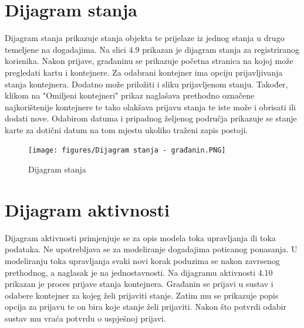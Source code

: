 			\eject
		
		\section{Dijagram stanja}
		
		Dijagram stanja prikazuje stanja objekta te prijelaze iz jednog stanja u drugo temeljene na dogadajima. Na slici 4.9 prikazan je dijagram stanja za registriranog
korisnika. Nakon prijave, građaninu se prikazuje početna stranica na kojoj može pregledati kartu i kontejnere. Za odabrani kontejner ima opciju prijavljivanja stanja kontejnera. Dodatno može priložiti i sliku prijavljenom stanju. Također, klikom na "Omiljeni kontejneri" prikaz naglašava prethodno označene najkorištenije kontejnere te tako olakšava prijavu stanja te iste može i obrisati ili dodati nove. Odabirom datuma i pripadnog željenog područja prikazuje se stanje karte za dotični datum na tom mjestu ukoliko traženi zapis postoji.
			
			\begin{figure}[H]
				\texttt{[image: figures/Dijagram stanja - građanin.PNG]}
				\centering
				\caption{Dijagram stanja}
				\label{fig:Dijagram stanja}
			\end{figure}
			
			\eject 
		
		\section{Dijagram aktivnosti}
			
			Dijagram aktivnosti primjenjuje se za opis modela toka upravljanja ili toka podataka. Ne upotrebljava se za modeliranje dogadajima poticanog ponasanja. U modeliranju toka upravljanja svaki novi korak poduzima se nakon zavrsenog prethodnog, a naglasak je na jednostavnosti. Na dijagramu aktivnosti 4.10 prikazan je proces prijave stanja kontejnera. Građanin se prijavi u sustav i odabere kontejner za kojeg želi prijaviti stanje. Zatim mu se prikazuje popis opcija za prijavu te on bira koje stanje želi prijaviti. Nakon što potvrdi odabir sustav mu vraća potvrdu o uspješnoj prijavi.
			
